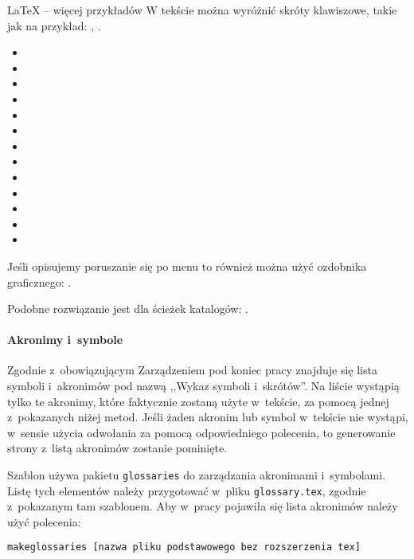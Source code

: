 \begin{easyappendix}{\LaTeX{} -- więcej przykładów}
W tekście można wyróżnić skróty klawiszowe, takie jak na przykład: , \keys{\ctrl, \Alt, \del}.
\begin{itemize}
	\item {}
	\item \keys{\Space} \keys{\SPACE}
	\item \keys{\backspace} \keys{\del} \keys{\backdel}
	\item \keys{\return} \keys{\enter}
	\item \keys{\shift} \keys{\capslock}
	\item \keys{\ctrl} \keys{\Alt} \keys{\AltGr}
	\item \keys{\tab}
	\item \keys{\esc} \keys{\oldesc}
	\item \keys{\winmenu}
	\item \keys{\arrowkey{^}} \keys{\arrowkeyup}
	\item {} \keys{\arrowkeydown}
	\item \keys{\arrowkey{>}} \keys{\arrowkeyright}
	\item \keys{\arrowkey{<}} \keys{\arrowkeyleft}
\end{itemize}

Jeśli opisujemy poruszanie się po menu to również można użyć ozdobnika graficznego: .

Podobne rozwiązanie jest dla ścieżek katalogów: .

\paragraph{Akronimy i~symbole}
Zgodnie z~obowiązującym Zarządzeniem pod koniec pracy znajduje się lista symboli i~akronimów pod nazwą ,,Wykaz symboli i~skrótów''. Na liście wystąpią tylko te akronimy, które faktycznie zostaną użyte w~tekście, za pomocą jednej z~pokazanych niżej metod. Jeśli żaden akronim lub symbol w~tekście nie wystąpi, w~sensie użycia odwołania za pomocą odpowiedniego polecenia, to generowanie strony z~listą akronimów zostanie pominięte.

Szablon używa pakietu \texttt{glossaries} do zarządzania akronimami i~symbolami. Listę tych elementów należy przygotować w~pliku \texttt{glossary.tex}, zgodnie z~pokazanym tam szablonem. Aby w~pracy pojawiła się lista akronimów należy użyć polecenia:

\begin{lstlisting}[language=bash,
	numbers=none,
	caption=Wygenerowanie listy skrótów i~symboli,
	label={lst:gloss}]
	makeglossaries [nazwa pliku podstawowego bez rozszerzenia tex]
\end{lstlisting}


\end{easyappendix}
